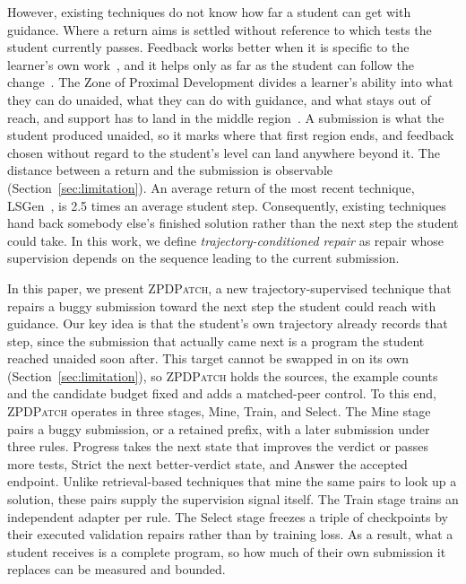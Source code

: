 \documentclass[10pt,conference]{IEEEtran}
\begin{document}
However, existing techniques do not know how far a student can get with guidance. Where a return aims is settled without reference to which tests the student currently passes. Feedback works better when it is specific to the learner's own work~\cite{hattie2007power,shute2008focus}, and it helps only as far as the student can follow the change~\cite{narciss2008feedback,aleven2000limitations}. The Zone of Proximal Development divides a learner's ability into what they can do unaided, what they can do with guidance, and what stays out of reach, and support has to land in the middle region~\cite{cole1978mind}. A submission is what the student produced unaided, so it marks where that first region ends, and feedback chosen without regard to the student's level can land anywhere beyond it. The distance between a return and the submission is observable~\cite{murray2002toward,chounta2017grey,schulze2024beyond} (Section~\ref{sec:limitation}). An average return of the most recent technique, LSGen~\cite{dai2026learner}, is 2.5 times an average student step. Consequently, existing techniques hand back somebody else's finished solution rather than the next step the student could take. In this work, we define \emph{trajectory-conditioned repair} as repair whose supervision depends on the sequence leading to the current submission.

In this paper, we present \textsc{ZPDPatch}, a new trajectory-supervised technique that repairs a buggy submission toward the next step the student could reach with guidance. Our key idea is that the student's own trajectory already records that step, since the submission that actually came next is a program the student reached unaided soon after. This target cannot be swapped in on its own (Section~\ref{sec:limitation}), so \textsc{ZPDPatch} holds the sources, the example counts and the candidate budget fixed and adds a matched-peer control. To this end, \textsc{ZPDPatch} operates in three stages, Mine, Train, and Select. The Mine stage pairs a buggy submission, or a retained prefix, with a later submission under three rules. Progress takes the next state that improves the verdict or passes more tests, Strict the next better-verdict state, and Answer the accepted endpoint. Unlike retrieval-based techniques that mine the same pairs to look up a solution, these pairs supply the supervision signal itself. The Train stage trains an independent adapter per rule. The Select stage freezes a triple of checkpoints by their executed validation repairs rather than by training loss. As a result, what a student receives is a complete program, so how much of their own submission it replaces can be measured and bounded.
\end{document}
